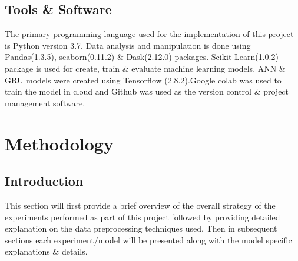 \documentclass[twoside,11pt,a4paper]{article}
\begin{document}
\subsection{Tools \& Software}
The primary programming language used for the implementation of this project is Python version 3.7. Data analysis and manipulation is done using Pandas(1.3.5), seaborn(0.11.2) \& Dask(2.12.0) packages. Scikit Learn(1.0.2) package is used for create, train \& evaluate machine learning models. \acs{ANN} \& \acs{GRU} models were created using Tensorflow (2.8.2).Google colab was used to train the model in cloud and Github was used as the version control \& project management software.

\vfill
\clearpage
\section{Methodology}\label{sec:methodology}
\subsection{Introduction}
This section will first provide a brief overview of the overall strategy of the experiments performed as part of this project followed by  providing detailed explanation on the data preprocessing techniques used. Then in subsequent sections each experiment/model will be presented along with the model specific explanations \& details.
\end{document}
